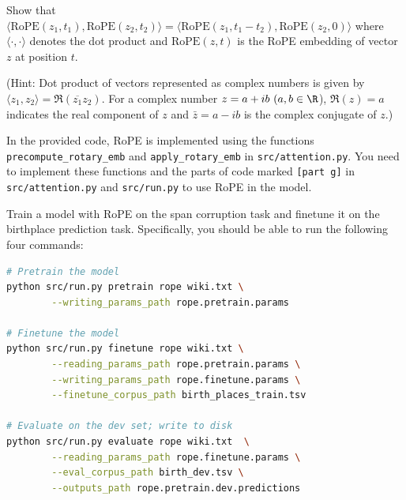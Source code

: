 \begin{parts}
\begin{subparts}
Show that $\langle \text{RoPE}(z_1, t_1), \text{RoPE}(z_2, t_2) \rangle = \langle \text{RoPE}(z_1, t_1 - t_2), \text{RoPE}(z_2, 0) \rangle$ where $\langle \cdot, \cdot \rangle$ denotes the dot product and $\text{RoPE}(z, t)$ is the RoPE embedding of vector $z$ at position $t$.

(Hint: Dot product of vectors represented as complex numbers is given by $\langle z_1, z_2 \rangle = \Re(\overline{z_1} z_2)$. For a complex number $z = a + ib\ (a,b\in\R$), $\Re(z) = a$ indicates the real component of $z$ and $\bar{z} = a - ib$ is the complex conjugate of $z$.)



\subpart[8] In the provided code, RoPE is implemented using the functions \texttt{precompute\_rotary\_emb} and \texttt{apply\_rotary\_emb} in \texttt{src/attention.py}. You need to implement these functions and the parts of code marked \texttt{[part g]} in \texttt{src/attention.py} and \texttt{src/run.py} to use RoPE in the model.

Train a model with RoPE on the span corruption task and finetune it on the birthplace prediction task. Specifically, you should be able to run the following four commands:

\begin{lstlisting}[language=bash]
# Pretrain the model
python src/run.py pretrain rope wiki.txt \
        --writing_params_path rope.pretrain.params
        
# Finetune the model
python src/run.py finetune rope wiki.txt \
        --reading_params_path rope.pretrain.params \
        --writing_params_path rope.finetune.params \
        --finetune_corpus_path birth_places_train.tsv
        
# Evaluate on the dev set; write to disk
python src/run.py evaluate rope wiki.txt  \
        --reading_params_path rope.finetune.params \
        --eval_corpus_path birth_dev.tsv \
        --outputs_path rope.pretrain.dev.predictions
        

\end{lstlisting}
\end{subparts}
\end{parts}
